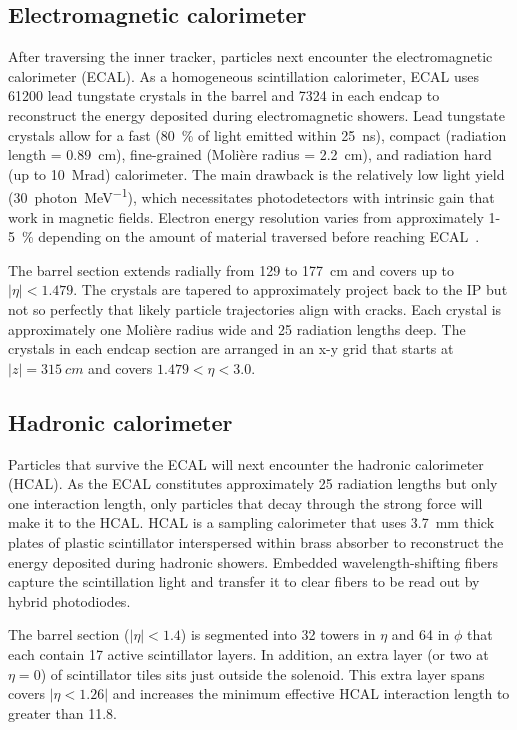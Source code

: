 \subsection{Electromagnetic calorimeter}
After traversing the inner tracker, particles next encounter the electromagnetic calorimeter (ECAL). As a homogeneous scintillation calorimeter, ECAL uses \num{61200} lead tungstate crystals in the barrel and \num{7324} in each endcap to reconstruct the energy deposited during electromagnetic showers. Lead tungstate crystals allow for a fast (\SI{80}{\percent} of light emitted within \SI{25}{\ns}), compact (radiation length = \SI{0.89}{cm}), fine-grained (Moli\`ere radius = \SI{2.2}{\cm}), and radiation hard (up to \SI{10}{\mega rad}) calorimeter. The main drawback is the relatively low light yield (\SI{30}{photon\per\mega\electronvolt}), which necessitates photodetectors with intrinsic gain that work in magnetic fields\cite{cms_experiment, cms_tdr_v1}. Electron energy resolution varies from approximately \num{1}-\SI{5}{\percent} depending on the amount of material traversed before reaching ECAL~\cite{cms_ecal_performance}.

The barrel section extends radially from \num{129} to \SI{177}{cm} and covers up to $|\eta|<1.479$. The crystals are tapered to approximately project back to the IP but not so perfectly that likely particle trajectories align with cracks. Each crystal is approximately one Moli\`ere radius wide and 25 radiation lengths deep. The crystals in each endcap section are arranged in an x-y grid that starts at $\lvert z \rvert = \SI{315}{cm}$ and covers $1.479<\eta<3.0$.

\subsection{Hadronic calorimeter}
Particles that survive the ECAL will next encounter the hadronic calorimeter (HCAL). As the ECAL constitutes approximately 25 radiation lengths but only one interaction length, only particles that decay through the strong force will make it to the HCAL. HCAL is a sampling calorimeter that uses \SI{3.7}{\milli\metre} thick plates of plastic scintillator interspersed within brass absorber to reconstruct the energy deposited during hadronic showers. Embedded wavelength-shifting fibers capture the scintillation light and transfer it to clear fibers to be read out by hybrid photodiodes.

The barrel section ($|\eta|<1.4$) is segmented into \num{32} towers in $\eta$ and \num{64} in $\phi$ that each contain 17 active scintillator layers. In addition, an extra layer (or two at $\eta = \num{0}$) of scintillator tiles sits just outside the solenoid. This extra layer spans covers $|\eta<1.26|$ and increases the minimum effective HCAL interaction length to greater than \num{11.8}.

